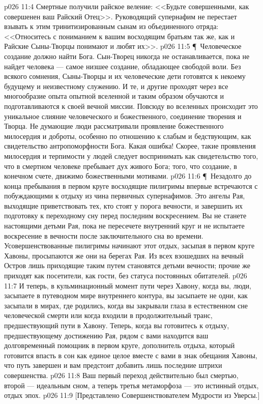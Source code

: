 \vs p026 11:4 Смертные получили райское веление: <<Будьте совершенными, как совершенен ваш Райский Отец>>. Руководящий супернафим не перестает взывать к этим тринитизированным сынам из объединенного отряда: <<Относитесь с пониманием к вашим восходящим братьям так же, как и Райские Сыны\hyp{}Творцы понимают и любят их>>.
\vs p026 11:5 \P\ Человеческое создание должно найти Бога. Сын\hyp{}Творец никогда не останавливается, пока не найдет человека --- самое низшее создание, обладающее свободой воли. Без всякого сомнения, Сыны\hyp{}Творцы и их человеческие дети готовятся к некоему будущему и неизвестному служению. И те, и другие проходят через все многообразие опыта опытной вселенной и таким образом обучаются и подготавливаются к своей вечной миссии. Повсюду во вселенных происходит это уникальное слияние человеческого и божественного, соединение творения и Творца. Не думающие люди рассматривали проявление божественного милосердия и доброты, особенно по отношению к слабым и бедствующим, как свидетельство антропоморфности Бога. Какая ошибка! Скорее, такие проявления милосердия и терпимости у людей следует воспринимать как свидетельство того, что в смертном человеке пребывает дух живого Бога; того, что создание, в конечном счете, движимо божественными мотивами.
\vs p026 11:6 \P\ Незадолго до конца пребывания в первом круге восходящие пилигримы впервые встречаются с побуждающими к отдыху из чина первичных супернафимов. Это ангелы Рая, выходящие приветствовать тех, кто стоят у порога вечности, и завершить их подготовку к переходному сну перед последним воскресением. Вы не станете настоящими детьми Рая, пока не пересечете внутренний круг и не испытаете воскресение в вечности после заключительного сна во времени. Усовершенствованные пилигримы начинают этот отдых, засыпая в первом круге Хавоны, просыпаются же они на берегах Рая. Из всех взошедших на вечный Остров лишь приходящие таким путем становятся детьми вечности; прочие же приходят как посетители, как гости, без статуса постоянных обитателей.
\vs p026 11:7 И теперь, в кульминационный момент пути через Хавону, когда вы, люди, засыпаете в путеводном мире внутреннего контура, вы засыпаете не одни, как засыпали в мирах, где родились, когда вы закрывали глаза в естественном сне человеческой смерти или когда входили в продолжительный транс, предшествующий пути в Хавону. Теперь, когда вы готовитесь к отдыху, предшествующему достижению Рая, рядом с вами находится ваш долговременный помощник в первом круге, дополнитель отдыха, который готовится впасть в сон как единое целое вместе с вами в знак обещания Хавоны, что путь завершен и вам предстоит добавить лишь последние штрихи совершенства.
\vs p026 11:8 Ваш первый переход действительно был смертью, второй --- идеальным сном, а теперь третья метаморфоза --- это истинный отдых, отдых эпох.
\vs p026 11:9 [Представлено Совершенствователем Мудрости из Уверсы.]

